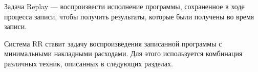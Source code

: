 Задача Replay — 
воспроизвести исполнение программы, сохраненное в ходе процесса записи, 
чтобы получить результаты, которые были получены во время записи.

Система RR ставит задачу воспроизведения записанной программы 
с минимальными накладными расходами. Для этого используется комбинация различных техник, 
описанных в следующих разделах.